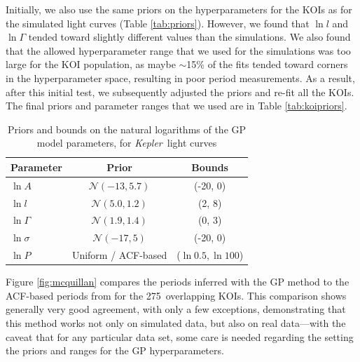 \documentclass[useAMS, usenatbib, preprint, 12pt]{aastex}
\newcommand{\nkoimcq}{275}
\newcommand{\Kepler}{{\it Kepler}}
\begin{document}
Initially, we also use the same priors on the hyperparameters for the KOIs
as for the simulated light curves (Table \ref{tab:priors}).
However, we found that $\ln l$ and $\ln \Gamma$ tended toward slightly different
values than the simulations.  We also found that the allowed hyperparameter
range that we used for the simulations was too large for the KOI population,
as maybe $\sim$15\% of the fits tended toward corners in the hyperparameter
space, resulting in poor period measurements.  As a result, after this initial
test, we subsequently adjusted the priors and re-fit all the KOIs.  The final
priors and parameter ranges that we used are in Table \ref{tab:koipriors}.

\begin{table}
\begin{center}
\caption{Priors and bounds on the natural logarithms of the GP model parameters,
        for \Kepler\ light curves}
\begin{tabular}{lcc}
Parameter & Prior & Bounds\\
    \hline
    $\ln A$ & $\mathcal N(-13, 5.7)$ & (-20, 0) \\
    $\ln l$ & $\mathcal N(5.0, 1.2)$ & (2, 8) \\
    $\ln \Gamma$ & $\mathcal N(1.9, 1.4)$ & (0, 3) \\
    $\ln \sigma$ & $\mathcal N(-17, 5)$ & (-20, 0) \\
    $\ln P $ & Uniform / ACF-based & ($\ln 0.5, \ln 100$) \\
\end{tabular}
\end{center}
\end{table}
\label{tab:koipriors}

Figure \ref{fig:mcquillan} compares the periods inferred with the GP method to the
ACF-based periods from \citet{Mcquillan2013} for the \nkoimcq\ overlapping KOIs.
This comparison shows generally very good agreement, with only a few exceptions,
demonstrating that this method works not only on simulated data, but also on
real data---with the caveat that for any particular data set, some care is needed
regarding the setting the priors and ranges for the GP hyperparameters.
\end{document}
